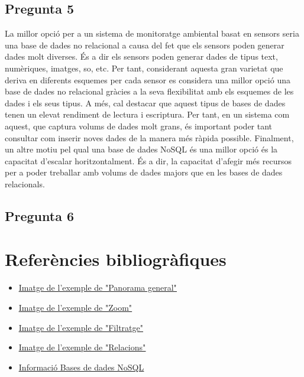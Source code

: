 \documentclass[a4paper,12pt]{report}
\begin{document}
\subsection*{Pregunta 5}
La millor opció per a un sistema de monitoratge ambiental basat en sensors seria una base de dades no relacional a causa del fet que els sensors poden generar dades molt diverses. És a dir els sensors poden generar dades de tipus text, numèriques, imatges, so, etc. Per tant, considerant aquesta gran varietat que deriva en diferents esquemes per cada sensor es considera una millor opció una base de dades no relacional gràcies a la seva flexibilitat amb els esquemes de les dades i els seus tipus. A més, cal destacar que aquest tipus de bases de dades tenen un elevat rendiment de lectura i escriptura. Per tant, en un sistema com aquest, que captura volums de dades molt grans, és important poder tant consultar com inserir noves dades de la manera més ràpida possible. Finalment, un altre motiu pel qual una base de dades NoSQL és una millor opció és la capacitat d'escalar horitzontalment. És a dir, la capacitat d'afegir més recursos per a poder treballar amb volums de dades majors que en les bases de dades relacionals.
\subsection*{Pregunta 6}


\section*{Referències bibliogràfiques}
\begin{itemize}
    \item \href{https://evotic.es/wp-content/uploads/2022/10/dashboard_ventas.png}{\underline{Imatge de l'exemple de "Panorama general"}}
    \item \href{https://r-charts.com/es/correlacion/zoom-grafico_files/figure-html/zoom.png}{\underline{Imatge de l'exemple de "Zoom"}}
    \item \href{https://cdn.exceltotal.com/wp-content/uploads/2014/02/filtros-en-excel-03.png}{\underline{Imatge de l'exemple de "Filtratge"}}
    \item \href{https://cdn.kastatic.org/ka-perseus-images/8aa21944eef2879cea9080a2ae2fbcb98cec0ddf.png}{\underline{Imatge de l'exemple de "Relacions"}}
    \item \href{https://www.arsys.es/blog/bases-de-datos-nosql-que-son-tipos-y-ventajas#tree-3}{\underline{Informació Bases de dades NoSQL}}
\end{itemize}
\end{document}
